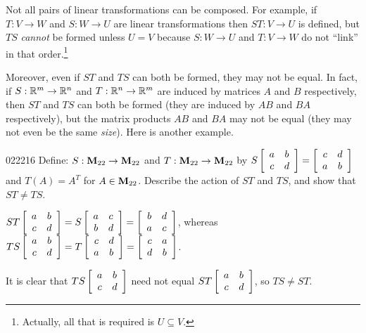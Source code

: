 Not all pairs of linear transformations can be composed. For example, if $T : V \to W$ and $S : W \to U$ are linear transformations then $ST : V \to U$ is defined, but $TS$ \textit{cannot} be formed unless $U = V$ because $S : W \to U$ and $T : V \to W$ do not ``link'' in that order.\footnote{Actually, all that is required is $U \subseteq V$.}



Moreover, even if $ST$ and $TS$ can both be formed, they may not be equal. In fact, if $S : \mathbb{R}^m \to \mathbb{R}^n$ and $T : \mathbb{R}^n \to \mathbb{R}^m$ are induced by matrices $A$ and $B$ respectively, then $ST$ and $TS$ can both be formed (they are induced by $AB$ and $BA$ respectively), but the matrix products $AB$ and $BA$ may not be equal (they may not even be the same \textit{size}). Here is another example.


\begin{example}{}{022216}
Define: $S : \textbf{M}_{22} \to \textbf{M}_{22}$ and $T : \textbf{M}_{22} \to \textbf{M}_{22}$ by $S\left[ \begin{array}{cc}
a & b \\
c & d
\end{array} \right] = \left[ \begin{array}{cc}
c & d \\
a & b
\end{array} \right]$
 and $T(A) = A^{T}$ for $A \in \textbf{M}_{22}$. Describe the action of $ST$ and $TS$, and show that $ST \neq TS$.


\begin{solution}
$ST\left[ \begin{array}{cc}
a & b \\
c & d
\end{array} \right] = S\left[ \begin{array}{cc}
a & c \\
b & d
\end{array} \right] = \left[ \begin{array}{cc}
b & d \\
a & c
\end{array} \right]$, whereas $TS\left[ \begin{array}{cc}
a & b \\
c & d
\end{array} \right] = T\left[ \begin{array}{cc}
c & d \\
a & b
\end{array} \right] = \left[ \begin{array}{cc}
c & a \\
d & b
\end{array} \right]$.

It is clear that $TS\left[ \begin{array}{cc}
a & b \\
c & d
\end{array} \right]$
 need not equal $ST\left[ \begin{array}{cc}
 a & b \\
 c & d
 \end{array} \right]$, so $TS \neq ST$.
\end{solution}
\end{example}

